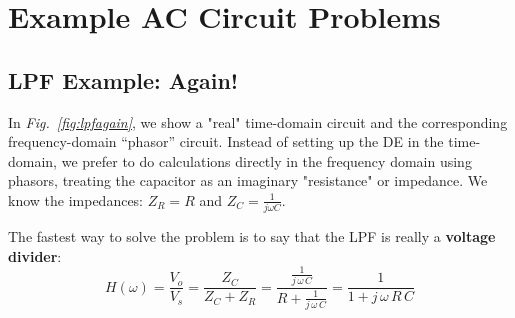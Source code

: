 \section{Example AC Circuit Problems}
\subsection{LPF Example: Again!}
In \emph{Fig.~\ref{fig:lpfagain}}, we show a "real"  time-domain circuit and the corresponding frequency-domain “phasor” circuit.   Instead of setting up the DE in the time-domain, we prefer to do calculations directly in the frequency domain using phasors, treating the capacitor as an imaginary "resistance" or impedance.  We know the impedances: ${Z_R} = R $ and $ {Z_C} = \frac{1}{{j\omega C}}$.

The fastest way to solve the problem is to say that the LPF is really a \textbf{voltage divider}:
    \begin{equation}
        H(\omega) = \frac{V_o}{V_s} = \frac{Z_C}{Z_C + Z_R}
        = \frac{\frac{1}{j\,\omega\,C}}{R + \frac{1}{j\,\omega\,C}} = \frac{1}{1 + j\,\omega\,R\,C}
    \end{equation}
